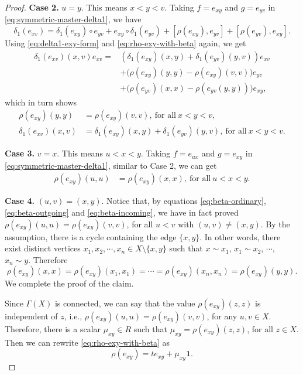 \documentclass[reqno]{amsart}
\numberwithin{equation}{section}
\theoremstyle{plain}
\theoremstyle{definition}
\newcommand{\one}{\mathbf 1}
\begin{document}
\begin{proof}
{\bf Case 2.} $u=y$. This means $x<y<v$. Taking $f=e_{xy}$ and $g=e_{yv}$ in \eqref{eq:symmetric-master-delta1}, we have
$$\delta_1(e_{xv})=\delta_1(e_{xy})\circ e_{yv}+e_{xy}\circ\delta_1(e_{yv})+[\rho(e_{xy}),e_{yv}]+[\rho(e_{yv}),e_{xy}].$$
Using \eqref{eq:delta1-exy-form} and \eqref{eq:rho-exy-with-beta} again, we get
\begin{equation*}
\begin{aligned}
\delta_1(e_{xv})(x,v)e_{xv}
={}&(\delta_1(e_{xy})(x,y)+\delta_1(e_{yv})(y,v))e_{xv}
\\
&+\bigl(\rho(e_{xy})(y,y)-\rho(e_{xy})(v,v)\bigr)e_{yv}\\
&+\bigl(\rho(e_{yv})(x,x)-\rho(e_{yv}(y,y))\bigr)e_{xy},
\end{aligned}
\end{equation*}
which in turn shows
\begin{align}
\rho(e_{xy})(y,y)&=\rho(e_{xy})(v,v), ~\text{for~all}~x<y<v,
\label{eq:beta-outgoing}\\
\delta_1(e_{xv})(x,v)&=\delta_1(e_{xy})(x,y)+\delta_1(e_{yv})(y,v), ~\text{for~all}~x<y<v.
\label{eq:lambda-right}
\end{align}

{\bf Case 3.} $v=x$. This means $u<x<y$. Taking $f=e_{ux}$ and $g=e_{xy}$ in \eqref{eq:symmetric-master-delta1},
similar to Case 2, we can get
\begin{align}
\rho(e_{xy})(u,u)&=\rho(e_{xy})(x,x), ~\text{for~all}~u<x<y. \label{eq:beta-incoming}
\end{align}

{\bf Case 4.} $(u,v)=(x,y)$. Notice that, by equations \eqref{eq:beta-ordinary}, \eqref{eq:beta-outgoing} and \eqref{eq:beta-incoming},
we have in fact proved $\rho(e_{xy})(u,u)=\rho(e_{xy})(v,v)$, for all $u<v$ with $(u,v)\neq(x,y)$.
By the assumption, there is a cycle containing the edge $\{x,y\}$.
In other words, there exist distinct vertices $x_1,x_2,\cdots,x_n\in X\setminus \{x,y\}$ such that
$x\sim x_1$, $x_1\sim x_2$, $\cdots$, $x_n\sim y$. Therefore
\[
\rho(e_{xy})(x,x)=\rho(e_{xy})(x_1,x_1)=\cdots=\rho(e_{xy})(x_n,x_n)=\rho(e_{xy})(y,y).
\]
We complete the proof of the claim.

Since $\Gamma(X)$ is connected, we can say that the value $\rho(e_{xy})(z,z)$ is independent of $z$, i.e.,
$\rho(e_{xy})(u,u)=\rho(e_{xy})(v,v)$, for any $u,v\in X$. Therefore, there is a scalar $\mu_{xy}\in R$ such that
$\mu_{xy}=\rho(e_{xy})(z,z)$, for all $z\in X$. Then we can rewrite \eqref{eq:rho-exy-with-beta} as
\begin{equation}\label{eq:rho-exy-final}
\rho(e_{xy})=te_{xy}+\mu_{xy}\one.
\end{equation}


\end{proof}
\end{document}
